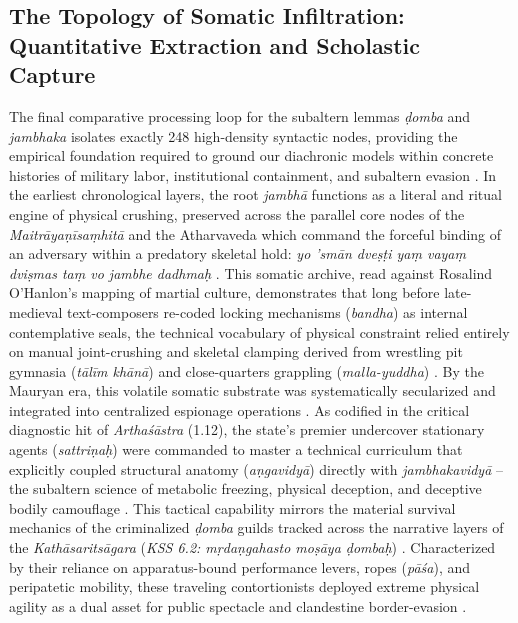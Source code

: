 \documentclass[11pt,twoside,letterpaper]{article}
\begin{document}
\subsection{The Topology of Somatic Infiltration: Quantitative Extraction and Scholastic Capture}
The final comparative processing loop for the subaltern lemmas \textit{ḍomba} and \textit{jambhaka} isolates exactly 248 high-density syntactic nodes, providing the empirical foundation required to ground our diachronic models within concrete histories of military labor, institutional containment, and subaltern evasion \citep{Lorenzen1978, McCartneyForthcomingDomingA}. In the earliest chronological layers, the root \textit{jambhā} functions as a literal and ritual engine of physical crushing, preserved across the parallel core nodes of the \textit{Maitrāyaṇīsaṃhitā} and the Atharvaveda which command the forceful binding of an adversary within a predatory skeletal hold: \textit{yo ’smān dveṣṭi yaṃ vayaṃ dviṣmas taṃ vo jambhe dadhmaḥ} \citep{McCartneyForthcomingDomingB}. This somatic archive, read against Rosalind O’Hanlon’s mapping of martial culture, demonstrates that long before late-medieval text-composers re-coded locking mechanisms (\textit{bandha}) as internal contemplative seals, the technical vocabulary of physical constraint relied entirely on manual joint-crushing and skeletal clamping derived from wrestling pit gymnasia (\textit{tālīm khānā}) and close-quarters grappling (\textit{malla-yuddha}) \citep{Birch2024, OHanlon2007}.
By the Mauryan era, this volatile somatic substrate was systematically secularized and integrated into centralized espionage operations \citep{McCartney2026}. As codified in the critical diagnostic hit of \textit{Arthaśāstra} (1.12), the state’s premier undercover stationary agents (\textit{sattriṇaḥ}) were commanded to master a technical curriculum that explicitly coupled structural anatomy (\textit{aṇgavidyā}) directly with \textit{jambhakavidyā} – the subaltern science of metabolic freezing, physical deception, and deceptive bodily camouflage \citep{McCartney2026}. This tactical capability mirrors the material survival mechanics of the criminalized \textit{ḍomba} guilds tracked across the narrative layers of the \textit{Kathāsaritsāgara} (\textit{KSS 6.2: mṛdaṇgahasto moṣāya ḍombaḥ}) \citep{McCartneyForthcomingDomingB}. Characterized by their reliance on apparatus-bound performance levers, ropes (\textit{pāśa}), and peripatetic mobility, these traveling contortionists deployed extreme physical agility as a dual asset for public spectacle and clandestine border-evasion \citep{McCartney2026, McCartneyForthcomingDomingB}.
\end{document}
